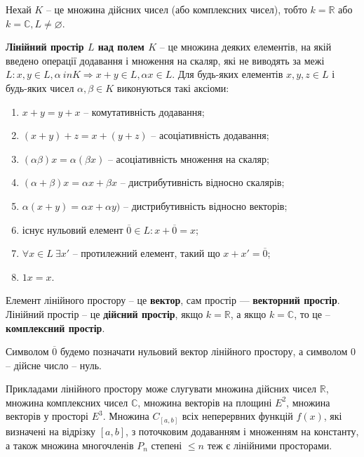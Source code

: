 Нехай $K$ -- це множина дійсних чисел (або комплексних чисел), тобто $k = \mathbb{R}$
або $k = \mathbb{C}, L \neq \varnothing$. 

\begin{definition}
	\textbf{Лінійний простір $L$ над полем $K$} -- це множина деяких
	елементів, на якій введено операції додавання і множення на скаляр, які не
	виводять за межі $L : x, y \in L, \alpha \ in K \Rightarrow x + y \in L, \alpha x \in L$. Для будь-яких
	елементів $x, y, z \in L$ і будь-яких чисел $\alpha, \beta \in K$ виконуються такі аксіоми:
	\begin{enumerate}
		\item $x + y = y + x$ -- комутативність додавання;
		\item $(x+y)+z = x+(y+z)$ -- асоціативність додавання;
		\item $(\alpha \beta)x = \alpha (\beta x)$ -- асоціативність множення на скаляр;
		\item $(\alpha + \beta)x = \alpha x + \beta x$ -- дистрибутивність відносно скалярів;
		\item $\alpha(x + y) = \alpha x + \alpha y)$ -- дистрибутивність відносно векторів;
		\item існує нульовий елемент $\overline{0} \in L: x + \overline{0} = x$;
		\item $\forall x \in L \: \exists x'$ -- протилежний елемент, такий що $x + x' = \overline{0}$;
		\item $1 x = x$.
	\end{enumerate}
\end{definition}

Елемент лінійного простору -- це \textbf{вектор}, сам простір ---
\textbf{векторний простір}. Лінійний простір -- це \textbf{дійсний простір}, якщо $k = \mathbb{R}$,
а якщо $k = \mathbb{C}$, то це -- \textbf{комплексний простір}.

\begin{remark}
	Символом $\overline{0}$ будемо позначати нульовий вектор лінійного
	простору, а символом 0 -- дійсне число -- нуль.
\end{remark}

Прикладами лінійного простору може слугувати множина дійсних чисел $\mathbb{R}$,
множина комплексних чисел $\mathbb{C}$, множина векторів на площині $E^2$, множина 
векторів у просторі $E^3$. Множина $C_{[a,b]}$ всіх неперервних функцій $f(x)$, які
визначені на відрізку $[a,b]$, з поточковим додаванням і множенням на константу, а
також множина многочленів $P_n$ степені $\leqslant n$ теж є лінійними просторами.

